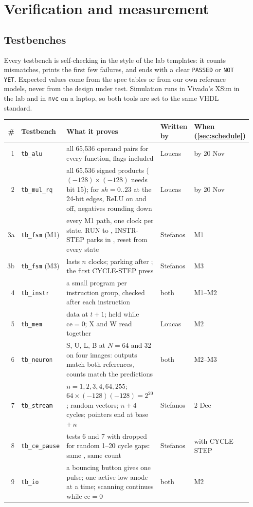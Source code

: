 \section{Verification and measurement}\label{sec:verify}

\subsection{Testbenches}

Every testbench is self-checking in the style of the lab templates: it counts mismatches, prints the first few failures, and ends with a clear \texttt{PASSED} or \texttt{NOT YET}. Expected values come from the spec tables or from our own reference models, never from the design under test. Simulation runs in Vivado's XSim in the lab and in \texttt{nvc} on a laptop, so both tools are set to the same VHDL standard.

\begin{center}\small
\begin{tabularx}{\linewidth}{@{}r l L l l@{}}
\toprule
\# & Testbench & What it proves & Written by & When (\cref{sec:schedule}) \\
 & \texttt{tb\_alu} & all 65,536 operand pairs for every function, flags included & Loucas & by 20 Nov \\
2 & \texttt{tb\_mul\_rq} & all 65,536 signed products ($(-128)\times(-128)$ needs bit 15);  for $sh = 0..23$ at the 24-bit edges, ReLU on and off, negatives rounding down & Loucas & by 20 Nov \\
3a & \texttt{tb\_fsm} (M1) & every M1 path, one clock per state, RUN to , INSTR-STEP parks in , reset from every state & Stefanos & M1 \\
3b & \texttt{tb\_fsm} (M3) &  lasts $n$ clocks; parking after ; the first CYCLE-STEP press & Stefanos & M3 \\
4 & \texttt{tb\_instr} & a small program per instruction group, checked after each instruction & both & M1--M2 \\
5 & \texttt{tb\_mem} & data at $t+1$; held while $\mathrm{ce}=0$; X and W read together & Loucas & M2 \\
6 & \texttt{tb\_neuron} & S, U, L, B at $N = 64$ and 32 on four images: outputs match both references, counts match the predictions & both & M2--M3 \\
7 & \texttt{tb\_stream} & $n = 1, 2, 3, 4, 64, 255$; $64 \times (-128)(-128) = 2^{20}$; random vectors; $n+4$ cycles; pointers end at base $+\,n$ & Stefanos & 2 Dec \\
8 & \texttt{tb\_ce\_pause} & tests 6 and 7 with  dropped for random 1--20 cycle gaps: same , same count & Stefanos & with CYCLE-STEP \\
9 & \texttt{tb\_io} & a bouncing button gives one pulse; one active-low anode at a time; scanning continues while $\mathrm{ce}=0$ & both & M2 \\
\bottomrule
\end{tabularx}
\end{center}

